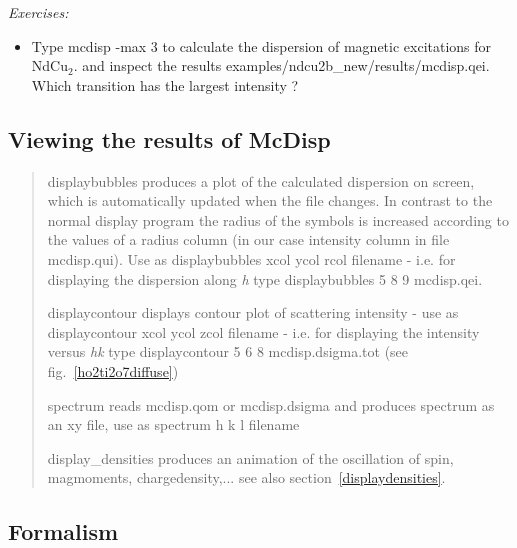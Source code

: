 \vspace{1cm}
{\em Exercises:}
\begin{itemize}
\item Type {\prg mcdisp -max 3} to
calculate the dispersion of magnetic excitations for NdCu$_2$.
and inspect the results
{\prg examples/ndcu2b\_new/results/mcdisp.qei}.
Which  transition has the largest intensity ?
\end{itemize}

\subsection{Viewing the results of McDisp}

\begin{quote}
\item [\prg displaybubbles\index{displaybubbles} ] produces a plot of the calculated dispersion on screen, which is 
                       automatically updated when the file changes. In contrast to the normal
		       display program the radius of the symbols is increased according to
		       the values of a radius column (in our case intensity column in file
		       mcdisp.qui). Use as {\prg displaybubbles 
		       xcol ycol rcol filename} - i.e. for displaying the dispersion along
		       {\em h} type {\prg displaybubbles  5 8 9 mcdisp.qei}. 
\item [\prg displaycontour\index{displaycontour}] displays contour plot of scattering intensity - use as
                       {\prg displaycontour xcol ycol zcol filename} - i.e. for displaying
		       the intensity versus {\em hk} type {\prg displaycontour 5 6 8 mcdisp.dsigma.tot}
		       (see fig.~\ref{ho2ti2o7diffuse})
\item [\prg spectrum]  reads mcdisp.qom or mcdisp.dsigma and produces spectrum
                       as an xy file, use as {\prg spectrum h k l filename}
\item [\prg display\_densities\index{display\_densities}] produces an animation of the 
                       oscillation of spin, magmoments, chargedensity,... see also
                       section~\ref{displaydensities}.
\end{quote}

\subsection{Formalism}
\label{formalism}

